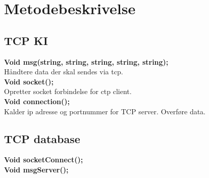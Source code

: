 \section{Metodebeskrivelse}
\subsection{TCP KI}
\textbf{Void msg(string, string, string, string, string);}\\
Håndtere data der skal sendes via tcp.\\
\textbf{Void socket();}\\
Opretter socket forbindelse for ctp client.\\
\textbf{Void connection();}\\
Kalder ip adresse og portnummer for TCP server. Overføre data.\\

\subsection{TCP database}
\textbf{Void socketConnect();}\\
\textbf{Void msgServer();}\\




